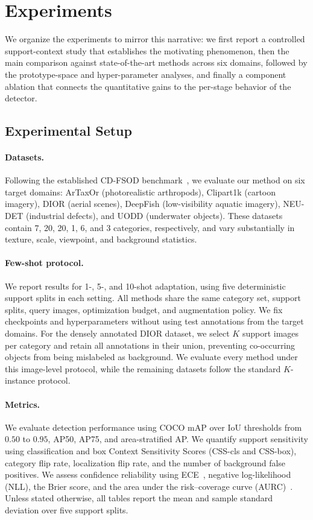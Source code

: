 \section{Experiments}
\label{sec:experiments}

We organize the experiments to mirror this narrative: we first report a controlled support-context study that establishes the motivating phenomenon, then the main comparison against state-of-the-art methods across six domains, followed by the prototype-space and hyper-parameter analyses, and finally a component ablation that connects the quantitative gains to the per-stage behavior of the detector.

\subsection{Experimental Setup}
\label{sec:exp_setup}

\paragraph{Datasets.}
Following the established CD-FSOD benchmark~\cite{cdvito,astigmatism,lmp}, we evaluate our method on six target domains: ArTaxOr (photorealistic arthropods), Clipart1k (cartoon imagery), DIOR (aerial scenes), DeepFish (low-visibility aquatic imagery), NEU-DET (industrial defects), and UODD (underwater objects). These datasets contain 7, 20, 20, 1, 6, and 3 categories, respectively, and vary substantially in texture, scale, viewpoint, and background statistics.

\paragraph{Few-shot protocol.}
We report results for 1-, 5-, and 10-shot adaptation, using five deterministic support splits in each setting. All methods share the same category set, support splits, query images, optimization budget, and augmentation policy. We fix checkpoints and hyperparameters without using test annotations from the target domains. For the densely annotated DIOR dataset, we select $K$ support images per category and retain all annotations in their union, preventing co-occurring objects from being mislabeled as background. We evaluate every method under this image-level protocol, while the remaining datasets follow the standard $K$-instance protocol.

\paragraph{Metrics.}
We evaluate detection performance using COCO mAP over IoU thresholds from $0.50$ to $0.95$, AP50, AP75, and area-stratified AP. We quantify support sensitivity using classification and box Context Sensitivity Scores (CSS-cls and CSS-box), category flip rate, localization flip rate, and the number of background false positives. We assess confidence reliability using ECE~\cite{calibration}, negative log-likelihood (NLL), the Brier score, and the area under the risk--coverage curve (AURC)~\cite{selective}. Unless stated otherwise, all tables report the mean and sample standard deviation over five support splits.


